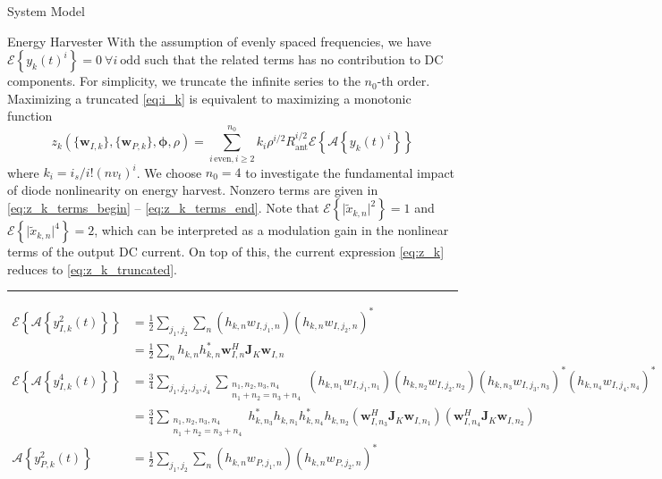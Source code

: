 \documentclass{IEEEtran}
\begin{document}
\begin{section}{System Model}
\begin{subsection}{Energy Harvester}
		With the assumption of evenly spaced frequencies, we have $\mathcal{E}\left\{y_k(t)^i\right\}=0 \ \forall i \ \mathrm{odd}$ such that the related terms has no contribution to DC components. For simplicity, we truncate the infinite series to the $n_0$-th order. Maximizing a truncated \ref{eq:i_k} is equivalent to maximizing a monotonic function \cite{Clerckx2016a}
		\begin{equation}\label{eq:z_k}
			z_k(\{\boldsymbol{w}_{I,k}\},\{\boldsymbol{w}_{P,k}\},\boldsymbol{\phi},\rho)=\sum_{i\,\text{even},i\ge2}^{n_0}{k_i}{\rho^{i/2}}{R_{\text{ant}}^{i/2}}{\mathcal{E}\left\{\mathcal{A}\left\{y_k(t)^i\right\}\right\}}
		\end{equation}
		where $k_i=i_s/i!(nv_t)^i$. We choose $n_0=4$ to investigate the fundamental impact of diode nonlinearity on energy harvest. Nonzero terms are given in \ref{eq:z_k_terms_begin} -- \ref{eq:z_k_terms_end}. Note that $\mathcal{E}\left\{\lvert\tilde{x}_{k,n}\rvert^2\right\}=1$ and $\mathcal{E}\left\{\lvert\tilde{x}_{k,n}\rvert^4\right\}=2$, which can be interpreted as a modulation gain in the nonlinear terms of the output DC current. On top of this, the current expression \ref{eq:z_k} reduces to \ref{eq:z_k_truncated}.
		\begin{figure*}[b]
			\hrule
			\begin{align}
				\mathcal{E}\left\{\mathcal{A}\left\{y_{I,k}^2(t)\right\}\right\}
				& = \frac{1}{2}\sum_{j_1,j_2}\sum_n{(h_{k,n}w_{I,j_1,n})(h_{k,n}w_{I,j_2,n})^*}\label{eq:z_k_terms_begin}\\
				& = \frac{1}{2}\sum_n{h_{k,n}h_{k,n}^*{\boldsymbol{w}_{I,n}^H}{\boldsymbol{J}_{K}}{\boldsymbol{w}_{I,n}}}\\
				\mathcal{E}\left\{\mathcal{A}\left\{y_{I,k}^4(t)\right\}\right\}
				& = \frac{3}{4}\sum_{j_1,j_2,j_3,j_4}\sum_{\substack{{n_1},{n_2},{n_3},{n_4}\\{n_1}+{n_2}={n_3}+{n_4}}}{(h_{k,{n_1}}w_{I,{j_1},{n_1}})(h_{k,{n_2}}w_{I,{j_2},{n_2}})(h_{k,{n_3}}w_{I,{j_3},{n_3}})^*(h_{k,{n_4}}w_{I,{j_4},{n_4}})^*}\\
				& = \frac{3}{4}\sum_{\substack{{n_1},{n_2},{n_3},{n_4}\\{n_1}+{n_2}={n_3}+{n_4}}}{h_{k,n_3}^*h_{k,n_1}h_{k,n_4}^*h_{k,n_2}(\boldsymbol{w}_{I,n_3}^H\boldsymbol{J}_K\boldsymbol{w}_{I,n_1})(\boldsymbol{w}_{I,n_4}^H\boldsymbol{J}_K\boldsymbol{w}_{I,n_2})}\\
				\mathcal{A}\left\{y_{P,k}^2(t)\right\}
				& = \frac{1}{2}\sum_{j_1,j_2}\sum_n{(h_{k,n}w_{P,j_1,n})(h_{k,n}w_{P,j_2,n})^*}\\

\end{align}
\end{figure*}
\end{subsection}
\end{section}
\end{document}
